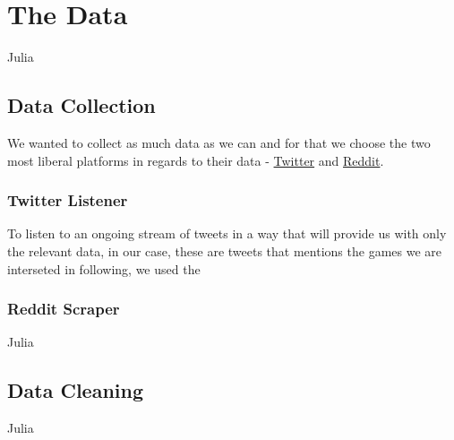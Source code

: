 \section{The Data}
Julia


\subsection{Data Collection}
We wanted to collect as much data as we can and for that we choose the two most liberal platforms in regards to their data - \href{http://www.twitter.com}{Twitter} and \href{http://www.reddit.com}{Reddit}.

\subsubsection{Twitter Listener}
To listen to an ongoing stream of tweets in a way that will provide us with only the relevant data, in our case, these are tweets that mentions the games we are interseted in following, we used the 

\subsubsection{Reddit Scraper}
Julia

\subsection{Data Cleaning}
Julia
